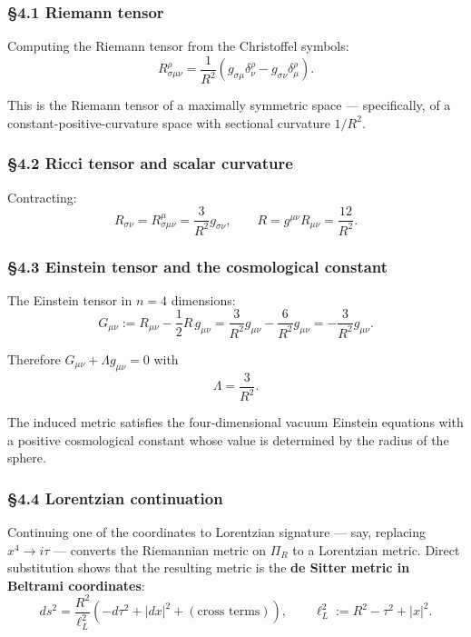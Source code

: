 \documentclass[a4paper,11pt]{article}
\theoremstyle{definition}
\begin{document}
\subsubsection{§4.1 Riemann tensor}\label{riemann-tensor}

Computing the Riemann tensor from the Christoffel symbols:
\[R^\rho_{\sigma\mu\nu} = \frac{1}{R^2}(g_{\sigma\mu} \delta^\rho_\nu - g_{\sigma\nu} \delta^\rho_\mu).\]

This is the Riemann tensor of a maximally symmetric space ---
specifically, of a constant-positive-curvature space with sectional
curvature \(1/R^2\).

\subsubsection{§4.2 Ricci tensor and scalar
curvature}\label{ricci-tensor-and-scalar-curvature}

Contracting:
\[R_{\sigma\nu} = R^\mu_{\sigma\mu\nu} = \frac{3}{R^2} g_{\sigma\nu}, \qquad R = g^{\mu\nu} R_{\mu\nu} = \frac{12}{R^2}.\]

\subsubsection{§4.3 Einstein tensor and the cosmological
constant}\label{einstein-tensor-and-the-cosmological-constant}

The Einstein tensor in \(n = 4\) dimensions:
\[G_{\mu\nu} := R_{\mu\nu} - \frac{1}{2} R\, g_{\mu\nu} = \frac{3}{R^2} g_{\mu\nu} - \frac{6}{R^2} g_{\mu\nu} = -\frac{3}{R^2} g_{\mu\nu}.\]

Therefore \(G_{\mu\nu} + \Lambda g_{\mu\nu} = 0\) with
\[\boxed{\;\Lambda = \frac{3}{R^2}.\;}\]

The induced metric satisfies the four-dimensional vacuum Einstein
equations with a positive cosmological constant whose value is
determined by the radius of the sphere.

\subsubsection{§4.4 Lorentzian
continuation}\label{lorentzian-continuation}

Continuing one of the coordinates to Lorentzian signature --- say,
replacing \(x^4 \to i\tau\) --- converts the Riemannian metric on
\(\Pi_R\) to a Lorentzian metric. Direct substitution shows that the
resulting metric is the \textbf{de Sitter metric in Beltrami
coordinates}:
\[ds^2 = \frac{R^2}{\ell_L^2}\left(-d\tau^2 + |dx|^2 + (\text{cross terms})\right), \qquad \ell_L^2 := R^2 - \tau^2 + |x|^2.\]
\end{document}
